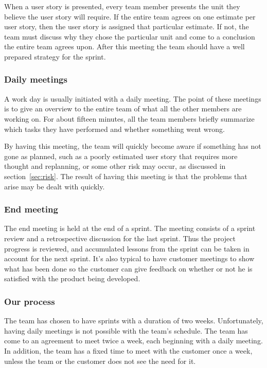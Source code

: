 When a user story is presented, every team member presents the unit they believe the user story will require. If the entire team agrees on one estimate per user story, then the user story is assigned that particular estimate. If not, the team must discuss why they chose the particular unit and come to a conclusion the entire team agrees upon.
After this meeting the team should have a well prepared strategy for the sprint.


\subsubsection{Daily meetings}
A work day is usually initiated with a daily meeting. The point of these meetings is to give an overview to the entire team of what all the other members are working on. For about fifteen minutes, all the team members briefly summarize which tasks they have performed and whether something went wrong.

By having this meeting, the team will quickly become aware if something has not gone as planned, such as a poorly estimated user story that requires more thought and replanning, or some other risk may occur, as discussed in section~\ref{sec:risk}. The result of having this meeting is that the problems that arise may be dealt with quickly.

\subsubsection{End meeting}
The end meeting is held at the end of a sprint. The meeting consists of a sprint review and a retrospective discussion for the last sprint.
Thus the project progress is reviewed, and accumulated lessons from the sprint can be taken in account for the next sprint.
It's also typical to have customer meetings to show what has been done so the customer can give feedback on 
whether or not he is satisfied with the product being developed.

\subsubsection{Our process}
The team has chosen to have sprints with a duration of two weeks. Unfortunately, having daily meetings is not possible with the team's schedule. The team has come to an agreement to meet twice a week, each beginning with a daily meeting. In addition, the team has a fixed time to meet with the customer once a week, unless the team or the customer does not see the need for it.

